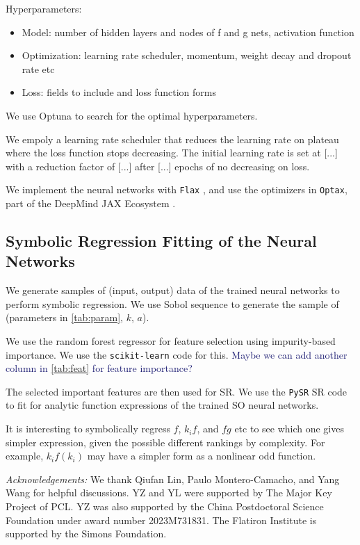 \documentclass[modern, trackchanges, dvipsnames]{aastex631}
\newcommand{\YL}[1]{\textcolor{Bittersweet}{#1}}
\newcommand{\YZ}[1]{\textcolor{MidnightBlue}{#1}}
\begin{document}
Hyperparameters:
\begin{itemize}
  \item Model: number of hidden layers and nodes of f and g nets, activation function
  \item Optimization: learning rate scheduler, momentum, weight decay and dropout rate etc
  \item Loss: fields to include and loss function forms
\end{itemize}

We use Optuna \citep{optuna_2019} to search for the optimal hyperparameters.

We empoly a learning rate scheduler that reduces the learning rate on plateau
where the loss function stops decreasing.
The initial learning rate is set at [...] with a reduction factor of [...] after
[...] epochs of no decreasing on loss.


We implement the neural networks with \texttt{Flax} \citep{flax2020github}, and
use the optimizers in \texttt{Optax}, part of the DeepMind JAX Ecosystem
\citep{deepmind2020jax}.



\vspace{1em}
\subsection{Symbolic Regression Fitting of the Neural Networks}

We generate samples of (input, output) data of the trained neural
networks to perform symbolic regression.
We use Sobol sequence to generate the sample of (parameters in
\autoref{tab:param}, $k$, $a$).

We use the random forest regressor for feature selection using impurity-based
importance.
We use the \texttt{scikit-learn} \citep{scikit-learn} code for this.
\YZ{Maybe we can add another column in \autoref{tab:feat} for feature
importance?}

The selected important features are then used for SR.
We use the \texttt{PySR} \citep{PySR} SR code to fit for analytic
function expressions of the trained SO neural networks.

\YL{It is interesting to symbolically regress $f$, $k_i f$, and $f g$
etc to see which one gives simpler expression, given the possible
different rankings by complexity.
For example, $k_i f(k_i)$ may have a simpler form as a nonlinear odd
function.}


\vspace{1em}
\textit{\large Acknowledgements:}
We thank Qiufan Lin, Paulo Montero-Camacho, and Yang Wang for helpful
discussions.
YZ and YL were supported by The Major Key Project of PCL.
YZ was also supported by the China Postdoctoral Science Foundation under award
number 2023M731831.
The Flatiron Institute is supported by the Simons Foundation.
\end{document}
